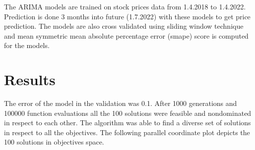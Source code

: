 \documentclass[11pt]{article} %
\begin{document}
The ARIMA models are trained on stock prices data from 1.4.2018 to 1.4.2022. Prediction is done 3 months into future (1.7.2022) with these models to get price prediction. The models are also cross validated using sliding window technique and mean symmetric mean absolute percentage error (smape) score is computed for the models.

\section{Results}

The error of the model in the validation was 0.1.
After 1000 generations and 100000 function evaluations all the 100 solutions were feasible and nondominated in respect to each other. The algorithm was able to find a diverse set of solutions in respect to all the objectives. The following parallel coordinate plot depicts the 100 solutions in objectives space. 
\end{document}
